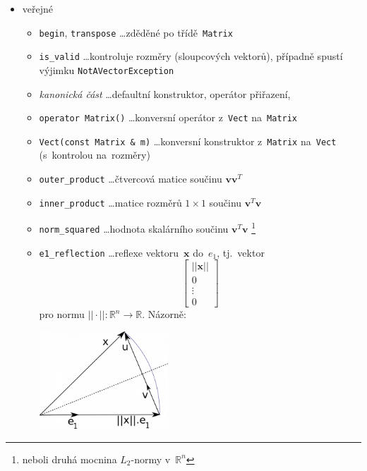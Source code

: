 \documentclass[11pt,a4paper]{article}
\newcommand{\R}{\mathbb{R}}
\newcommand{\V}{\mathbf{v}}
\newcommand{\x}{\mathbf{x}}
\theoremstyle{remark}
\begin{document}
\begin{itemize}
  \item veřejné
  \begin{itemize}
    \item \verb=begin=, \verb=transpose= \ldots zděděné po třídě~\verb=Matrix=
    \item \verb=is_valid= \ldots kontroluje rozměry (sloupcových vektorů),
      případně spustí výjimku \verb=NotAVectorException=
    \item \emph{kanonická část\/} \ldots defaultní konstruktor, operátor
      přiřazení, 
    \item \verb=operator Matrix()= \ldots konversní operátor z~\verb=Vect=
      na~\verb=Matrix=
    \item \verb=Vect(const Matrix & m)= \ldots konversní konstruktor
      z~\verb=Matrix= na~\verb=Vect= (s~kontrolou na~rozměry)
    \item \verb=outer_product= \ldots čtvercová matice součinu $\V\V^T$
    \item \verb=inner_product= \ldots matice rozměrů $1\times 1$ součinu
      $\V^T\V$
    \item \verb=norm_squared= \ldots hodnota skalárního součinu
      $\V^T\V$\thinspace%
      \footnote{neboli druhá mocnina $L_2$-normy v~$\R^n$}
    \item \verb=e1_reflection= \ldots reflexe vektoru~$\x$ do~$e_1$, tj.~vektor
      \[
        \begin{bmatrix}
          ||\x|| \\
          0 \\
          \vdots \\
          0
        \end{bmatrix}
      \]
      pro normu $||\cdot||\colon \R^n \to \R$.
      Názorně:

      \begin{center}
      \includegraphics[width=0.4\textwidth]{./householder_reflection.png}
      \end{center}


\end{itemize}
\end{itemize}
\end{document}
